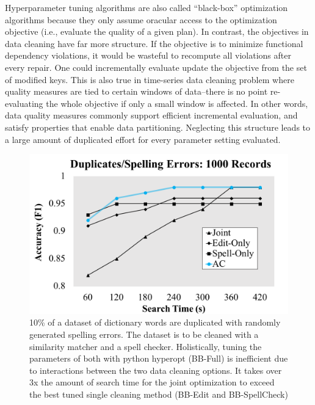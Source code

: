  Hyperparameter tuning algorithms are also called ``black-box'' optimization algorithms because they only assume oracular access to the optimization objective (i.e., evaluate the quality of a given plan). In contrast, the objectives in data cleaning have far more structure. 
If the objective is to minimize functional dependency violations, it would be wasteful to recompute all violations after every repair. One could incrementally evaluate update the objective from the set of modified keys.
This is also true in time-series data cleaning problem where quality measures are tied to certain windows of data--there is no point re-evaluating the whole objective if only a small window is affected.
In other words, data quality measures commonly support efficient incremental evaluation, and satisfy properties that enable data partitioning.  
Neglecting this structure leads to a large amount of duplicated effort for every parameter setting evaluated.

\begin{figure}[t]
\centering
 \includegraphics[width=0.9\columnwidth]{figures/teaser-experiment.png}
 \caption{\small 10\% of a dataset of dictionary words are duplicated with randomly generated spelling errors. The dataset is to be cleaned with a similarity matcher and a spell checker. Holistically, tuning the parameters of both with \textsf{python hyperopt} (BB-Full) is inefficient due to interactions between the two data cleaning options. It takes over 3x the amount of search time for the joint optimization to exceed the best tuned single cleaning method (BB-Edit and BB-SpellCheck) \label{fig:teaser}}
\end{figure}


